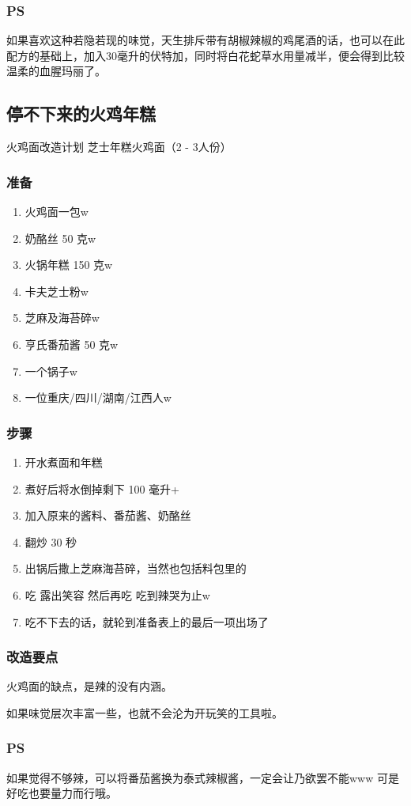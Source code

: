 \documentclass[12pt, a4paper]{ctexart}
\begin{document}
\subsubsection{PS}
如果喜欢这种若隐若现的味觉，天生排斥带有胡椒辣椒的鸡尾酒的话，也可以在此配方的基础上，加入30毫升的伏特加，同时将白花蛇草水用量减半，便会得到比较温柔的血腥玛丽了。

\subsection{停不下来的火鸡年糕}
火鸡面改造计划 芝士年糕火鸡面（2 - 3人份）

\subsubsection{准备}
\begin{enumerate}
    \item{火鸡面一包w}
    \item{奶酪丝 50 克w}
    \item{火锅年糕 150 克w}
    \item{卡夫芝士粉w}
    \item{芝麻及海苔碎w}
    \item{亨氏番茄酱 50 克w}
    \item{一个锅子w}
    \item{一位重庆/四川/湖南/江西人w}
\end{enumerate}

\subsubsection{步骤}
\begin{enumerate}
    \item{开水煮面和年糕}
    \item{煮好后将水倒掉剩下 100 毫升+}
    \item{加入原来的酱料、番茄酱、奶酪丝}
    \item{翻炒 30 秒}
    \item{出锅后撒上芝麻海苔碎，当然也包括料包里的}
    \item{吃 露出笑容 然后再吃 吃到辣哭为止w}
    \item{吃不下去的话，就轮到准备表上的最后一项出场了}
\end{enumerate}

\subsubsection{改造要点}
火鸡面的缺点，是辣的没有内涵。

如果味觉层次丰富一些，也就不会沦为开玩笑的工具啦。

\subsubsection{PS}
如果觉得不够辣，可以将番茄酱换为泰式辣椒酱，一定会让乃欲罢不能www 可是好吃也要量力而行哦。
\end{document}
